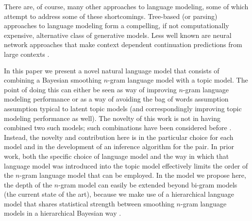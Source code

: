 
There are, of course, many other approaches to language modeling, some of which attempt to address some of these shortcomings.  Tree-based (or parsing) approaches \cite{Roark2001,Collins2003,Johnson2007,Liang2007} to language modeling form a compelling, if not computationally expensive, alternative class of generative models.   %
Less well known are neural network approaches that make context dependent continuation predictions from large contexts \cite{Mnih2007,Mnih2009}.



In this paper we present a novel natural language model that consists of combining a Bayesian smoothing $n$-gram language model with a topic model.  The point of doing this can either be seen as way of improving $n$-gram language modeling performance or as a way of avoiding the bag of words assumption assumption typical to latent topic models (and correspondingly improving topic modeling performance as well).  The novelty of this work is not in having combined two such models; such combinations have been considered before \cite{Wallach2006}.  Instead, the novelty and contribution here is in the particular choice for each model and in the development of an inference algorithm for the pair.  In prior work, both the specific choice of language model and the way in which that language model was introduced into the topic model effectively limits the order of the $n$-gram language model that can be employed.  In the model we propose here, the depth of the $n$-gram model can easily be extended beyond bi-gram models (the current state of the art), because we make use of a hierarchical language model that shares statistical strength between smoothing $n$-gram language models in a hierarchical Bayesian way \cite{Wood2009}.  

